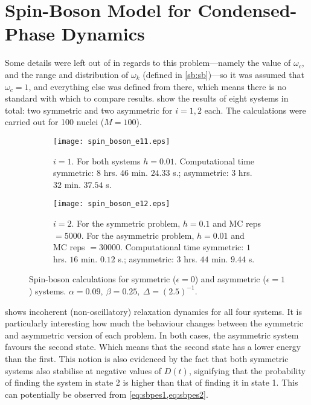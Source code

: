 \section{Spin-Boson Model for Condensed-Phase Dynamics}
%
Some details were left out of \cite{project} in regards to this problem---namely the value of $ \omega_{c} $, and the range and distribution of $ \omega_{k} $ (defined in \cref{sb:sb})---so it was assumed that $ \omega_{c} = 1$, and everything else was defined from there, which means there is no standard with which to compare results.  show the results of eight systems in total: two symmetric and two asymmetric for $ i = 1,2 $ each. The calculations were carried out for 100 nuclei ($ M=100 $).

\begin{figure}
\begin{subfigure}{\textwidth}
\centering
\texttt{[image: spin\_boson\_e11.eps]}
\caption{$ i = 1 $. For both systems $ h = 0.01$. Computational time symmetric: $ 8 $ hrs. $ 46 $ min. $ 24.33 $ s.; asymmetric: $ 3 $ hrs. $ 32 $ min. $ 37.54 $ s.}
\label{f:sbe11}
\end{subfigure}

\begin{subfigure}{\textwidth}
\centering
\texttt{[image: spin\_boson\_e12.eps]}
\caption{$ i = 2 $. For the symmetric problem, $ h = 0.1 $ and MC reps $ = 5000 $. For the asymmetric problem, $ h = 0.01 $ and MC reps $ = 30000 $. Computational time symmetric: $ 1 $ hrs. $ 16 $ min. $ 0.12 $ s.; asymmetric: $ 3 $ hrs. $ 44 $ min. $ 9.44 $ s.}
\label{f:sbe12}
\end{subfigure}
\caption{Spin-boson calculations for symmetric ($ \epsilon = 0 $) and asymmetric ($ \epsilon = 1 $) systems. $\alpha = 0.09,~\beta = 0.25,~\Delta = (2.5)^{-1}$.}
\label{f:sb1}
\end{figure}
 shows incoherent (non-oscillatory) relaxation dynamics for all four systems. It is particularly interesting how much the behaviour changes between the symmetric and asymmetric version of each problem. In both cases, the asymmetric system favours the second state. Which means that the second state has a lower energy than the first. This notion is also evidenced by the fact that both symmetric systems also stabilise at negative values of $ D(t) $, signifying that the probability of finding the system in state 2 is higher than that of finding it in state 1. This can potentially be observed from \cref{eq:sbpes1,eq:sbpes2}.

